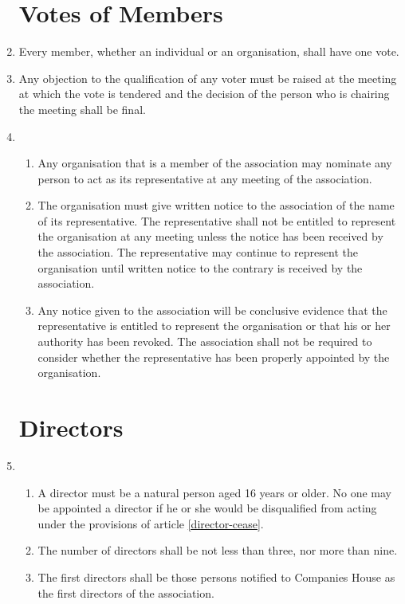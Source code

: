 \begin{enumerate}
\section{Votes of Members}

\item
  Every member, whether an individual or an organisation, shall have one vote.

\item
  Any objection to the qualification of any voter must be raised at
  the meeting at which the vote is tendered and the decision of the
  person who is chairing the meeting shall be final.
\item
  \begin{enumerate}
  \item
    Any organisation that is a member of the association may nominate any
    person to act as its representative at any meeting of the association.
  \item
    The organisation must give written notice to the association of the
    name of its representative. The representative shall not be
    entitled to represent the organisation at any meeting unless the
    notice has been received by the association. The representative may
    continue to represent the organisation until written notice to the
    contrary is received by the association.
  \item
    Any notice given to the association will be conclusive evidence that
    the representative is entitled to represent the organisation or
    that his or her authority has been revoked. The association shall not
    be required to consider whether the representative has been
    properly appointed by the organisation.
  \end{enumerate}

\section{Directors}

\item
  \begin{enumerate}
  \item
    A director must be a natural person aged 16 years or older.
    No one may be appointed a director if he or she would be
    disqualified from acting under the provisions of article
    \ref{director-cease}.
  \item
    The number of directors shall be not less than three, nor more than nine.

  \item
    The first directors shall be those persons notified to Companies
    House as the first directors of the association.


\end{enumerate}
\end{enumerate}
